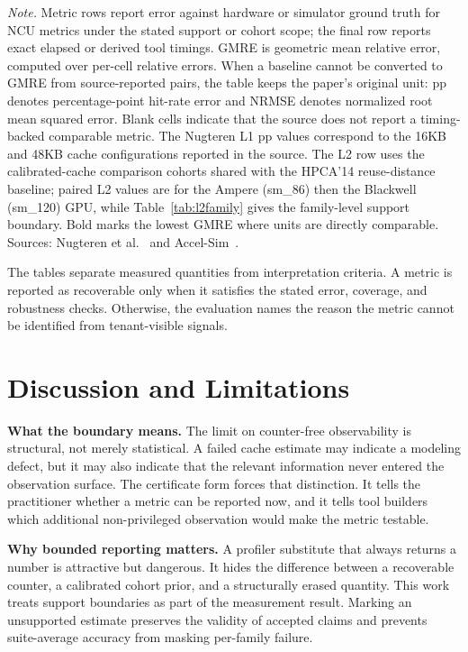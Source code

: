 \documentclass[conference]{IEEEtran}
\begin{document}
\begin{table}[!h]
\begin{minipage}{\columnwidth}
\fontsize{5.8}{6.5}\selectfont
\emph{Note.} Metric rows report error against hardware or simulator ground
truth for NCU metrics under the stated support or cohort scope; the final row
reports exact elapsed or derived tool timings. GMRE is geometric mean relative error,
computed over per-cell relative errors. When a baseline cannot be converted to
GMRE from source-reported pairs, the table keeps the paper's original unit:
pp denotes percentage-point hit-rate error and NRMSE denotes normalized root
mean squared error. Blank cells indicate that the source does not report a
timing-backed comparable metric. The Nugteren L1 pp values correspond to the
16KB and 48KB cache configurations reported in the source. The L2 row uses the
calibrated-cache comparison cohorts shared with the HPCA'14 reuse-distance
baseline; paired L2 values are for the Ampere (sm\_86) then the Blackwell
(sm\_120) GPU, while
Table~\ref{tab:l2family} gives the family-level support boundary. Bold marks
the lowest GMRE where units are directly comparable.
Sources:
Nugteren et al.~\cite{nugteren2014gpucache} and
Accel-Sim~\cite{khairy2020accelsim}.
\end{minipage}
\end{table}
\FloatBarrier

The tables separate measured quantities from interpretation criteria. A metric
is reported as recoverable only when it satisfies the stated error, coverage,
and robustness checks. Otherwise, the evaluation names the reason the metric
cannot be identified from tenant-visible signals.

\section{Discussion and Limitations}
\label{sec:discussion}

\textbf{What the boundary means.} The limit on counter-free observability is
structural, not merely statistical. A failed cache estimate may indicate a
modeling defect, but it may also indicate that the relevant information never
entered the observation surface. The certificate form forces that distinction.
It tells the practitioner whether a metric can be reported now, and it tells
tool builders which additional non-privileged observation would make the metric
testable.

\textbf{Why bounded reporting matters.} A profiler substitute that always returns a
number is attractive but dangerous. It hides the difference between a
recoverable counter, a calibrated cohort prior, and a structurally erased
quantity. This work treats support boundaries as part of the measurement result.
Marking an unsupported estimate preserves the validity of accepted claims and prevents
suite-average accuracy from masking per-family failure.
\end{document}
